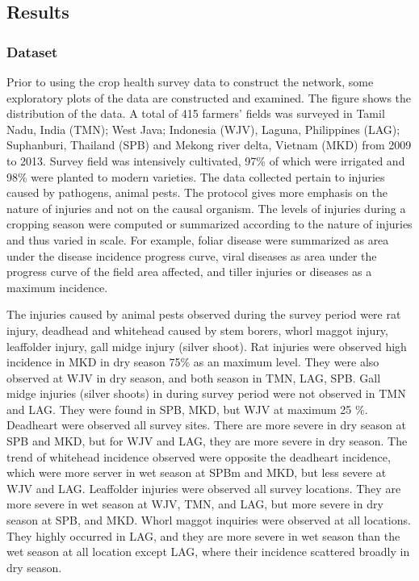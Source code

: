 \subsection{Results}

\subsubsection{Dataset}

Prior to using the crop health survey data to construct the network, some exploratory plots of the data are constructed and examined. The figure shows the distribution of the data. A total of 415 farmers' fields was surveyed in Tamil Nadu, India (TMN); West Java; Indonesia (WJV), Laguna, Philippines (LAG); Suphanburi, Thailand (SPB) and Mekong river delta, Vietnam (MKD) from 2009 to 2013. Survey field was intensively cultivated, 97\% of which were irrigated and 98\% were planted to modern varieties. The data collected pertain to injuries caused by pathogens, animal pests. The protocol gives more emphasis on the nature of injuries and not on the causal organism. The levels of injuries during a cropping season were computed or summarized according to the nature of injuries and thus varied in scale. For example, foliar disease were summarized as area under the disease incidence progress curve, viral diseases as area under the progress curve of the field area affected, and tiller injuries or diseases as a maximum incidence. 

The injuries caused by animal pests observed during the survey period were rat injury, deadhead and whitehead caused by stem borers, whorl maggot injury, leaffolder injury, gall midge injury (silver shoot). Rat injuries were observed high incidence in MKD in dry season 75\% as an maximum level. They were also observed at WJV in dry season, and both season in TMN, LAG, SPB. Gall midge injuries (silver shoots) in during survey period were not observed in TMN and LAG. They were found in SPB, MKD, but WJV at maximum 25 \%. Deadheart were observed all survey sites. There are more severe in dry season at SPB and MKD, but for WJV and LAG, they are  more severe in dry season. The trend of whitehead incidence observed were opposite the deadheart incidence, which were more server in wet season at SPBm and MKD, but less severe at WJV and LAG. Leaffolder injuries were observed all survey locations. They are more severe in wet season at WJV, TMN, and LAG, but more severe in dry season at SPB, and MKD. Whorl maggot inquiries were observed at all locations. They highly occurred in LAG, and they are more severe in wet season than the wet season at all location except LAG, where their incidence scattered broadly in dry season.

